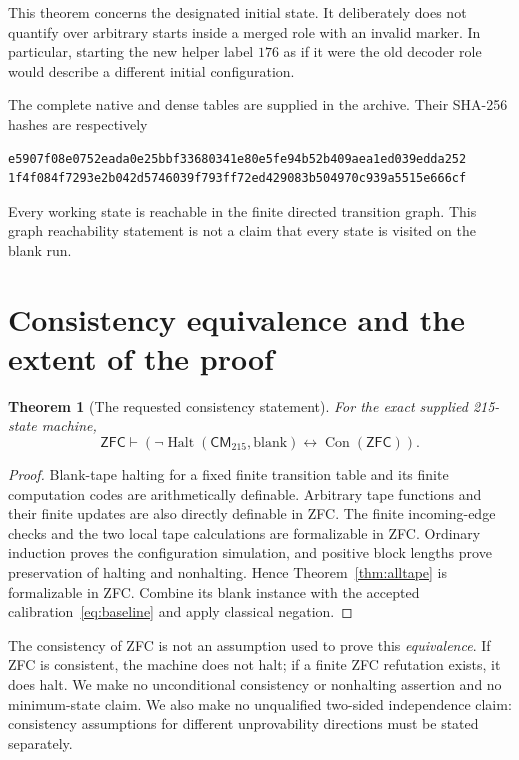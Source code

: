 \documentclass[11pt]{article}
\newtheorem{theorem}{Theorem}[section]
\theoremstyle{definition}\newtheorem{definition}[theorem]{Definition}
\theoremstyle{remark}\newtheorem{remark}[theorem]{Remark}
\newcommand{\Con}{\operatorname{Con}}
\newcommand{\Halt}{\operatorname{Halt}}
\newcommand{\ZFC}{\mathsf{ZFC}}
\newcommand{\Knew}{\mathsf{CM}_{215}}
\begin{document}
This theorem concerns the designated initial state. It deliberately does
not quantify over arbitrary starts inside a merged role with an invalid
marker. In particular, starting the new helper label $176$ as if it were
the old decoder role would describe a different initial configuration.

The complete native and dense tables are supplied in the archive. Their
SHA-256 hashes are respectively
\begin{lstlisting}
e5907f08e0752eada0e25bbf33680341e80e5fe94b52b409aea1ed039edda252
1f4f084f7293e2b042d5746039f793ff72ed429083b504970c939a5515e666cf
\end{lstlisting}
Every working state is reachable in the finite directed transition graph.
This graph reachability statement is not a claim that every state is
visited on the blank run.

\section{Consistency equivalence and the extent of the proof}

\begin{theorem}[The requested consistency statement]\label{thm:zfc}
For the exact supplied 215-state machine,
\[
 \ZFC\vdash\left(\neg\Halt(\Knew,\mathrm{blank})
                      \leftrightarrow\Con(\ZFC)\right).
\]
\end{theorem}
\begin{proof}
Blank-tape halting for a fixed finite transition table and its finite
computation codes are arithmetically definable. Arbitrary tape functions
and their finite updates are also directly definable in ZFC. The finite
incoming-edge checks and the two local tape calculations are formalizable
in ZFC. Ordinary induction proves the configuration simulation, and
positive block lengths prove preservation of halting and nonhalting.
Hence Theorem~\ref{thm:alltape} is formalizable in ZFC. Combine its blank
instance with the accepted calibration~\eqref{eq:baseline} and apply
classical negation.
\end{proof}

The consistency of ZFC is not an assumption used to prove this
\emph{equivalence}. If ZFC is consistent, the machine does not halt; if a
finite ZFC refutation exists, it does halt. We make no unconditional
consistency or nonhalting assertion and no minimum-state claim. We also
make no unqualified two-sided independence claim: consistency assumptions
for different unprovability directions must be stated separately.
\end{document}
